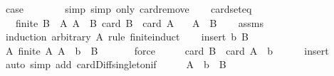 \begin{isabellebody}
\ {\isacharquery}{\kern0pt}case\isanewline
\ \ \ \ \ \ \isamarkupfalse%
\ simp\ {\isacharparenleft}{\kern0pt}simp\ only{\isacharcolon}{\kern0pt}\ card{\isachardot}{\kern0pt}remove{\isacharparenright}{\kern0pt}\isanewline
\ \ \isamarkupfalse%
\isanewline
{}\isamarkupfalse%
%
\endisatagproof
{\isafoldproof}%
%
\isadelimproof
\isanewline
%
\endisadelimproof
\isanewline
{}\isamarkupfalse%
\ card{\isacharunderscore}{\kern0pt}seteq{\isacharcolon}{\kern0pt}\ \isanewline
\ \ \ {\isachardoublequoteopen}finite\ B{\isachardoublequoteclose}\ \ A{\isacharcolon}{\kern0pt}\ {\isachardoublequoteopen}A\ {\isasymsubseteq}\ B{\isachardoublequoteclose}\ {\isachardoublequoteopen}card\ B\ {\isasymle}\ card\ A{\isachardoublequoteclose}\isanewline
\ \ \ {\isachardoublequoteopen}A\ {\isacharequal}{\kern0pt}\ B{\isachardoublequoteclose}\isanewline
%
\isadelimproof
\ \ %
\endisadelimproof
%
\isatagproof
{}\isamarkupfalse%
\ assms\isanewline
{}\isamarkupfalse%
\ {\isacharparenleft}{\kern0pt}induction\ arbitrary{\isacharcolon}{\kern0pt}\ A\ rule{\isacharcolon}{\kern0pt}\ finite{\isacharunderscore}{\kern0pt}induct{\isacharparenright}{\kern0pt}\isanewline
\ \ \isamarkupfalse%
\ {\isacharparenleft}{\kern0pt}insert\ b\ B{\isacharparenright}{\kern0pt}\isanewline
\ \ \isamarkupfalse%
\ \isamarkupfalse%
\ A{\isacharcolon}{\kern0pt}\ {\isachardoublequoteopen}finite\ A{\isachardoublequoteclose}\ {\isachardoublequoteopen}A\ {\isacharminus}{\kern0pt}\ {\isacharbraceleft}{\kern0pt}b{\isacharbraceright}{\kern0pt}\ {\isasymsubseteq}\ B{\isachardoublequoteclose}\ \isanewline
\ \ \ \ \isamarkupfalse%
\ force{\isacharplus}{\kern0pt}\isanewline
\ \ \isamarkupfalse%
\ \isamarkupfalse%
\ {\isachardoublequoteopen}card\ B\ {\isasymle}\ card\ {\isacharparenleft}{\kern0pt}A\ {\isacharminus}{\kern0pt}\ {\isacharbraceleft}{\kern0pt}b{\isacharbraceright}{\kern0pt}{\isacharparenright}{\kern0pt}{\isachardoublequoteclose}\isanewline
\ \ \ \ \isamarkupfalse%
\ insert\ \isamarkupfalse%
\ {\isacharparenleft}{\kern0pt}auto\ simp\ add{\isacharcolon}{\kern0pt}\ card{\isacharunderscore}{\kern0pt}Diff{\isacharunderscore}{\kern0pt}singleton{\isacharunderscore}{\kern0pt}if{\isacharparenright}{\kern0pt}\isanewline
\ \ \isamarkupfalse%
\ \isamarkupfalse%
\ {\isachardoublequoteopen}A\ {\isacharminus}{\kern0pt}\ {\isacharbraceleft}{\kern0pt}b{\isacharbraceright}{\kern0pt}\ {\isacharequal}{\kern0pt}\ B{\isachardoublequoteclose}\isanewline

\end{isabellebody}
